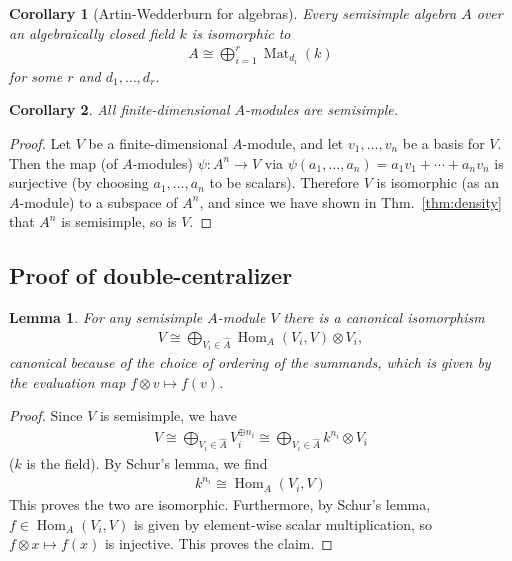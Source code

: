 \documentclass[11pt]{article}
\newtheorem{lem}{Lemma}
\newtheorem{cor}{Corollary}
\theoremstyle{definition}
\newcommand{\Hom}{\operatorname{Hom}}
\newcommand{\Mat}{\operatorname{Mat}}
\begin{document}
\begin{cor}[Artin-Wedderburn for algebras]
  Every semisimple algebra $A$ over an algebraically closed field $k$ is
  isomorphic to
  \begin{align}
    A \cong \bigoplus_{i=1}^r \Mat_{d_i}(k)
  \end{align}
  for some $r$ and $d_1, \dots, d_r$.
\end{cor}

\begin{cor}\label{cor:maschke}
  All finite-dimensional
  $A$-modules are semisimple.
\end{cor}

\begin{proof}
Let $V$  be a finite-dimensional $A$-module, and let $v_1, \dots, v_n$ be a
basis for $V$. Then the map (of $A$-modules) $\psi:A^n \to V$ via $\psi(a_1, \dots, a_n) = a_1v_1
+ \cdots + a_nv_n$ is surjective (by choosing $a_1, \dots, a_n$ to be scalars). Therefore $V$ is isomorphic (as an
$A$-module) to a subspace of $A^n$, and since we have shown
in Thm.~\ref{thm:density} that $A^n$ is semisimple, so is $V$.
\end{proof}

\subsection{Proof of double-centralizer}

\begin{lem}
  For any semisimple $A$-module $V$ there is a canonical isomorphism
\begin{align}
V \cong \bigoplus_{V_i \in \hat A}\Hom_A(V_i, V) \otimes V_i,
\end{align}
canonical because of the choice of ordering of the summands, which is given by
the evaluation map $f \otimes v \mapsto f(v)$.
\end{lem}

\begin{proof}\label{lem:altshur}
  Since $V$ is semisimple, we have
  \begin{align}
    V \cong \bigoplus_{V_i \in \hat A}V_i^{\oplus n_i} \cong \bigoplus_{V_i \in \hat A}k^{n_i} \otimes V_i
  \end{align}
  ($k$ is the field). By Schur's lemma, we find
  \begin{align}
    k^{n_i} \cong \Hom_A(V_i, V)
  \end{align}
  This proves the two are isomorphic.
  Furthermore, by Schur's lemma, $f \in \Hom_A(V_i, V)$ is given by element-wise
  scalar multiplication, so $f \otimes x \mapsto f(x)$ is injective. This proves the claim.
\end{proof}
\end{document}
